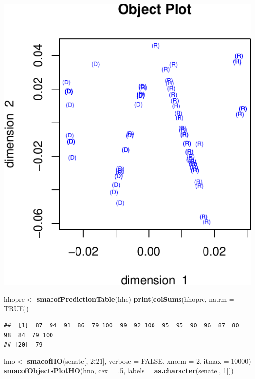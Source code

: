 \documentclass[
  12pt,
]{article}
\newenvironment{Shaded}{\begin{snugshade}}{\end{snugshade}}
\newcommand{\AttributeTok}[1]{\textcolor[rgb]{0.13,0.29,0.53}{#1}}
\newcommand{\ConstantTok}[1]{\textcolor[rgb]{0.56,0.35,0.01}{#1}}
\newcommand{\DecValTok}[1]{\textcolor[rgb]{0.00,0.00,0.81}{#1}}
\newcommand{\FunctionTok}[1]{\textcolor[rgb]{0.13,0.29,0.53}{\textbf{#1}}}
\newcommand{\NormalTok}[1]{#1}
\newcommand{\OtherTok}[1]{\textcolor[rgb]{0.56,0.35,0.01}{#1}}
\newcommand{\SpecialCharTok}[1]{\textcolor[rgb]{0.81,0.36,0.00}{\textbf{#1}}}
\begin{document}
\includegraphics{smacofHO_files/figure-latex/unnamed-chunk-4-2.pdf}

\begin{Shaded}
\begin{Highlighting}[]
\NormalTok{hhopre }\OtherTok{\textless{}{-}} \FunctionTok{smacofPredictionTable}\NormalTok{(hho)}
\FunctionTok{print}\NormalTok{(}\FunctionTok{colSums}\NormalTok{(hhopre, }\AttributeTok{na.rm =} \ConstantTok{TRUE}\NormalTok{))}
\end{Highlighting}
\end{Shaded}

\begin{verbatim}
##  [1]  87  94  91  86  79 100  99  92 100  95  95  90  96  87  80  98  84  79 100
## [20]  79
\end{verbatim}

\begin{Shaded}
\begin{Highlighting}[]
\NormalTok{hno }\OtherTok{\textless{}{-}} \FunctionTok{smacofHO}\NormalTok{(senate[, }\DecValTok{2}\SpecialCharTok{:}\DecValTok{21}\NormalTok{], }\AttributeTok{verbose =} \ConstantTok{FALSE}\NormalTok{, }\AttributeTok{xnorm =} \DecValTok{2}\NormalTok{, }\AttributeTok{itmax =} \DecValTok{10000}\NormalTok{)}
\FunctionTok{smacofObjectsPlotHO}\NormalTok{(hno, }\AttributeTok{cex =}\NormalTok{ .}\DecValTok{5}\NormalTok{, }\AttributeTok{labels =} \FunctionTok{as.character}\NormalTok{(senate[, }\DecValTok{1}\NormalTok{]))}
\end{Highlighting}
\end{Shaded}
\end{document}
